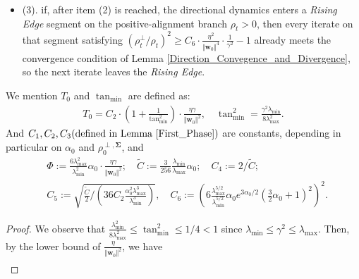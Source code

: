 \documentclass[pdflatex,sn-basic]{sn-jnl}%
\theoremstyle{thmstyleone}%
\begin{document}
\begin{appendices}
\begin{shaded}
\begin{restate_logis_spike}
\begin{itemize}
    \item (3). if, after item (2) is reached, the directional dynamics enters a \textit{Rising Edge} segment on the positive-alignment branch $\rho_t > 0$, then every iterate on that segment satisfying $\left(\rho_t^{\perp} / \rho_t\right)^2 \ge C_6 \cdot \frac{\eta^2}{\Vert \mathbf{w}_0 \Vert^4} \cdot \frac{1}{\gamma^2} - 1$
    already meets the convergence condition of Lemma \ref{Direction_Convegence_and_Divergence}, so the next iterate leaves the \textit{Rising Edge}.
  \end{itemize}
  We mention $T_0$ and $\tan_{\min}$ are defined as:
  \begin{equation*}
  \begin{aligned}
    T_0 = C_2 \cdot \left( 1 + \frac{1}{\tan_{\min}^2}\right) \cdot \frac{\eta \gamma}{\Vert \mathbf{w}_0 \Vert^2}, 
    \quad 
    \tan_{\min}^2 = \frac{\gamma^2 \lambda_{\min}}{8 \lambda_{\max}^2}.
  \end{aligned}
  \end{equation*}
  And $C_1, C_2, C_3 (\text{defined in Lemma \ref{First_Phase}})$ are constants, depending in particular on $\alpha_0$ and $\rho_0^{\perp, \mathbf{\Sigma}}$, and 
  \begin{equation*}
  \begin{aligned}
    & \Phi := \frac{6\lambda_{\max}^2 }{\lambda_{\min}^2 }
    \alpha_0 \cdot \frac{\eta \gamma}{\Vert \mathbf{w}_{0} \Vert^2}; 
    \quad
    \tilde{C} := \frac{3}{256} \frac{\lambda_{\min}}{\lambda_{\max}} \alpha_0;
    \quad C_4 := 2 / \tilde{C}; 
    \\ & 
    C_5 := 
    \sqrt{\frac{\tilde{C}}{2} / 
    \left(
      36 C_2 \frac{ \alpha_{0}^2 \lambda_{\max}^3}{\lambda_{\min}^3}
    \right)}, 
    \quad 
    C_6 := 
    \left(
      6
      \frac{\lambda_{\max}^{5/2}}{\lambda_{\min}^{5/2} }
      \alpha_0 e^{3 \alpha_0 / 2}\left( \frac{3}{2} \alpha_0 + 1 \right)^2
    \right)^2.
  \end{aligned}
  \end{equation*}
\end{restate_logis_spike}
\end{shaded}
\begin{proof}
  We observe that $\frac{\lambda_{\min}^2 }{8 \lambda_{\max}^2} \le \tan_{\min}^2 \le 1/4 < 1$ since $\lambda_{\min} \le \gamma^2 \le \lambda_{\max}$. 
  Then, by the lower bound of $\frac{\eta}{\Vert \mathbf{w}_0 \Vert^2}$, we have 
  \begin{equation*}
  \begin{aligned}

\end{aligned}
\end{equation*}
\end{proof}
\end{appendices}
\end{document}
